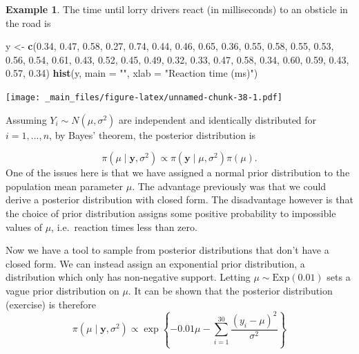 \documentclass[
]{book}
\newenvironment{Shaded}{\begin{snugshade}}{\end{snugshade}}
\newcommand{\AttributeTok}[1]{\textcolor[rgb]{0.13,0.29,0.53}{#1}}
\newcommand{\FloatTok}[1]{\textcolor[rgb]{0.00,0.00,0.81}{#1}}
\newcommand{\FunctionTok}[1]{\textcolor[rgb]{0.13,0.29,0.53}{\textbf{#1}}}
\newcommand{\NormalTok}[1]{#1}
\newcommand{\OtherTok}[1]{\textcolor[rgb]{0.56,0.35,0.01}{#1}}
\newcommand{\StringTok}[1]{\textcolor[rgb]{0.31,0.60,0.02}{#1}}
\theoremstyle{definition}
\theoremstyle{definition}
\newtheorem{example}{Example}[chapter]
\theoremstyle{definition}
\theoremstyle{definition}
\theoremstyle{remark}
\begin{document}
\begin{example}
\protect\hypertarget{exm:norm}{}\label{exm:norm}The time until lorry drivers react (in milliseconds) to an obsticle in the road is

\begin{Shaded}
\begin{Highlighting}[]
\NormalTok{y }\OtherTok{\textless{}{-}} \FunctionTok{c}\NormalTok{(}\FloatTok{0.34}\NormalTok{, }\FloatTok{0.47}\NormalTok{, }\FloatTok{0.58}\NormalTok{, }\FloatTok{0.27}\NormalTok{, }\FloatTok{0.74}\NormalTok{, }\FloatTok{0.44}\NormalTok{, }\FloatTok{0.46}\NormalTok{, }\FloatTok{0.65}\NormalTok{, }\FloatTok{0.36}\NormalTok{, }\FloatTok{0.55}\NormalTok{, }\FloatTok{0.58}\NormalTok{, }\FloatTok{0.55}\NormalTok{, }
       \FloatTok{0.53}\NormalTok{, }\FloatTok{0.56}\NormalTok{, }\FloatTok{0.54}\NormalTok{, }\FloatTok{0.61}\NormalTok{, }\FloatTok{0.43}\NormalTok{, }\FloatTok{0.52}\NormalTok{, }\FloatTok{0.45}\NormalTok{, }\FloatTok{0.49}\NormalTok{, }\FloatTok{0.32}\NormalTok{, }\FloatTok{0.33}\NormalTok{, }\FloatTok{0.47}\NormalTok{, }\FloatTok{0.58}\NormalTok{, }
       \FloatTok{0.34}\NormalTok{, }\FloatTok{0.60}\NormalTok{, }\FloatTok{0.59}\NormalTok{, }\FloatTok{0.43}\NormalTok{, }\FloatTok{0.57}\NormalTok{, }\FloatTok{0.34}\NormalTok{)}
\FunctionTok{hist}\NormalTok{(y, }\AttributeTok{main =} \StringTok{""}\NormalTok{, }\AttributeTok{xlab =} \StringTok{"Reaction time (ms)"}\NormalTok{)}
\end{Highlighting}
\end{Shaded}

\texttt{[image: \_main\_files/figure-latex/unnamed-chunk-38-1.pdf]}

Assuming \(Y_i \sim N(\mu, \sigma^2)\) are independent and identically distributed for \(i=1,...,n\), by Bayes' theorem, the posterior distribution is

\[
\pi(\mu \mid \boldsymbol{y}, \sigma^2) \propto \pi(\boldsymbol{y} \mid \mu, \sigma^2) \pi(\mu).
\]
One of the issues here is that we have assigned a normal prior distribution to the population mean parameter \(\mu\). The advantage previously was that we could derive a posterior distribution with closed form. The disadvantage however is that the choice of prior distribution assigns some positive probability to impossible values of \(\mu\), i.e.~reaction times less than zero.

Now we have a tool to sample from posterior distributions that don't have a closed form. We can instead assign an exponential prior distribution, a distribution which only has non-negative support. Letting \(\mu \sim \textrm{Exp}(0.01)\) sets a vague prior distribution on \(\mu\). It can be shown that the posterior distribution (exercise) is therefore
\[
\pi(\mu \mid \boldsymbol{y}, \sigma^2) \propto \exp\left\{-0.01\mu -\sum_{i=1}^{30}\frac{(y_i - \mu)^2}{\sigma^2}\right\} 
\]


\end{example}
\end{document}
